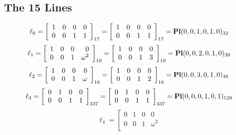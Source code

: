 \documentclass{article}
\begin{document}
{\subsection*{The 15 Lines}
$$
\ell_{0} = 
\left[
\begin{array}{*{4}{r}}
1 & 0 & 0 & 0\\
0 & 0 & 1 & 1\\
\end{array}
\right]
_{17}
=
\left[
\begin{array}{*{4}c}
1  & 0  & 0  & 0\\
0  & 0  & 1  & 1\\
\end{array}
\right]_{17}
={\rm\bf Pl}(0,0,1,0,1,0 )_{32}$$
$$
\ell_{1} = 
\left[
\begin{array}{*{4}{r}}
1 & 0 & 0 & 0\\
0 & 0 & 1 & \omega^{2}\\
\end{array}
\right]
_{19}
=
\left[
\begin{array}{*{4}c}
1  & 0  & 0  & 0\\
0  & 0  & 1  & 3\\
\end{array}
\right]_{19}
={\rm\bf Pl}(0,0,2,0,1,0 )_{39}$$
$$
\ell_{2} = 
\left[
\begin{array}{*{4}{r}}
1 & 0 & 0 & 0\\
0 & 0 & 1 & \omega \\
\end{array}
\right]
_{18}
=
\left[
\begin{array}{*{4}c}
1  & 0  & 0  & 0\\
0  & 0  & 1  & 2\\
\end{array}
\right]_{18}
={\rm\bf Pl}(0,0,3,0,1,0 )_{46}$$
$$
\ell_{3} = 
\left[
\begin{array}{*{4}{r}}
0 & 1 & 0 & 0\\
0 & 0 & 1 & 1\\
\end{array}
\right]
_{337}
=
\left[
\begin{array}{*{4}c}
0  & 1  & 0  & 0\\
0  & 0  & 1  & 1\\
\end{array}
\right]_{337}
={\rm\bf Pl}(0,0,0,1,0,1 )_{129}$$
$$
\ell_{4} = 
\left[
\begin{array}{*{4}{r}}
0 & 1 & 0 & 0\\
0 & 0 & 1 & \omega^{2}\\

\end{array}$$}
\end{document}
